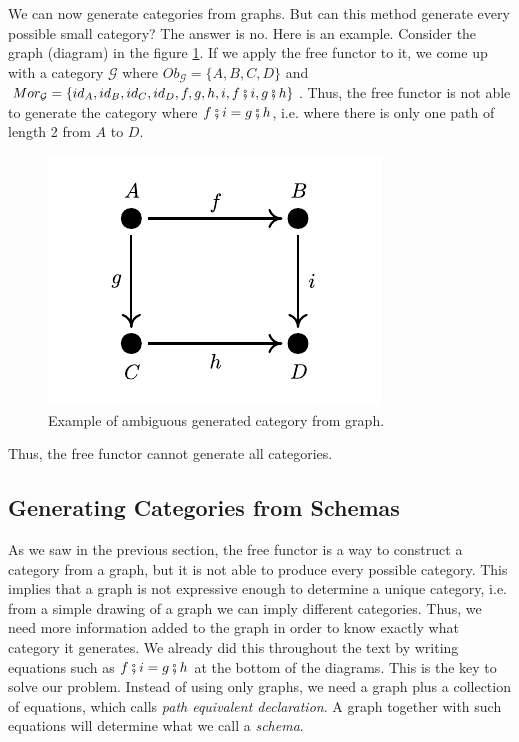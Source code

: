 We can now generate categories from graphs. But can this method generate
every possible small category? The answer is no. Here is an example.
Consider the graph (diagram) in the figure \ref{fig:Square}.
If we apply the free functor to it, we come up with a category $\mathcal G$
where $Ob_\mathcal G = \{A,B,C,D\}$ and $Mor_\mathcal G = \{id_A,id_B,id_C,id_D, f,g,h,i, f \fatsemi i, g \fatsemi h\}$.
Thus, the free functor is not able to generate the category where $f \fatsemi i = g \fatsemi h$, i.e.
where there is only one path of length 2 from $A$ to $D$.

\begin{figure}[H]
  \begin{center}
    \includegraphics{./notebooks/SquareGraph.pdf}
  \end{center}
  \caption{Example of ambiguous generated category from graph.}
  \label{fig:Square}
\end{figure}

Thus, the free functor cannot generate all categories.

\subsection{Generating Categories from Schemas}

As we saw in the previous section, the free functor is a way to construct a category
from a graph, but it is not able to produce every possible category. This implies
that a graph is not expressive enough to determine a unique category, i.e. from a simple
drawing of a graph we can imply different categories. Thus, we need more information
added to the graph in order to know exactly what category it generates. We already
did this throughout the text by writing equations such as $f \fatsemi i = g \fatsemi h$
at the bottom of the diagrams. This is the key to solve our problem. Instead of using
only graphs, we need a graph plus a collection of equations, which \citet{spivak2014category}
calls \textit{path equivalent declaration}. A graph together with such equations
will determine what we call a \textit{schema}.

